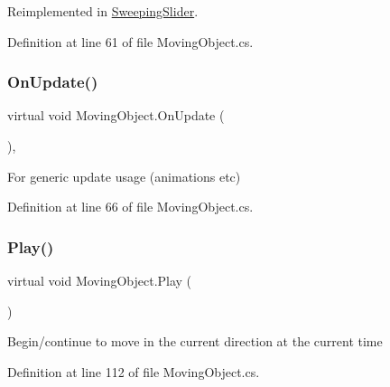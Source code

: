 Reimplemented in \mbox{\hyperlink{class_sweeping_slider_a333d1088bd5ef48fe770e43527f75c49}{Sweeping\+Slider}}.



Definition at line 61 of file Moving\+Object.\+cs.

\mbox{\label{class_moving_object_a81a2c65568d818f0f3a43c7e37b4fd02}} 
\subsubsection{\texorpdfstring{On\+Update()}{OnUpdate()}}
{\footnotesize\ttfamily virtual void Moving\+Object.\+On\+Update (\begin{DoxyParamCaption}{ }\end{DoxyParamCaption})\hspace{0.3cm}{\ttfamily [protected]}, {\ttfamily [virtual]}}



For generic update usage (animations etc) 



Definition at line 66 of file Moving\+Object.\+cs.

\mbox{\label{class_moving_object_ad6bfc4de0d0a787cc7ee22f592f8969f}} 
\subsubsection{\texorpdfstring{Play()}{Play()}}
{\footnotesize\ttfamily virtual void Moving\+Object.\+Play (\begin{DoxyParamCaption}{ }\end{DoxyParamCaption})\hspace{0.3cm}{\ttfamily [virtual]}}



Begin/continue to move in the current direction at the current time 



Definition at line 112 of file Moving\+Object.\+cs.

\mbox{\label{class_moving_object_a6c96ef69cae2a5820addbe6d09e3a7d6}} 
